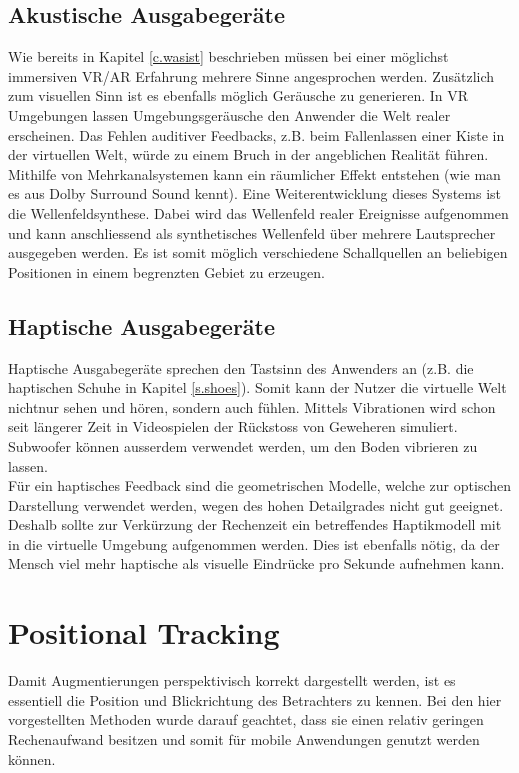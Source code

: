 \subsection*{Akustische Ausgabegeräte}
Wie bereits in Kapitel \ref{c.wasist} beschrieben müssen bei einer möglichst immersiven VR/AR Erfahrung mehrere Sinne angesprochen werden. Zusätzlich zum visuellen Sinn ist es ebenfalls möglich Geräusche zu generieren. In VR Umgebungen lassen Umgebungsgeräusche den Anwender die Welt realer erscheinen. Das Fehlen auditiver Feedbacks, z.B. beim Fallenlassen einer Kiste in der virtuellen Welt, würde zu einem Bruch in der angeblichen Realität führen.\\[6pt]
Mithilfe von Mehrkanalsystemen kann ein räumlicher Effekt entstehen (wie man es aus Dolby Surround Sound kennt). Eine Weiterentwicklung dieses Systems ist die Wellenfeldsynthese. Dabei wird das Wellenfeld realer Ereignisse aufgenommen und kann anschliessend als synthetisches Wellenfeld über mehrere Lautsprecher ausgegeben werden. Es ist somit möglich verschiedene Schallquellen an beliebigen Positionen in einem begrenzten Gebiet zu erzeugen.\cite[S.~154]{doerner13}
\vspace{-10pt}
\subsection*{Haptische Ausgabegeräte}
Haptische Ausgabegeräte sprechen den Tastsinn des Anwenders an (z.B. die haptischen Schuhe in Kapitel \ref{s.shoes}). Somit kann der Nutzer die virtuelle Welt nichtnur sehen und hören, sondern auch fühlen. Mittels Vibrationen wird schon seit längerer Zeit in Videospielen der Rückstoss von Geweheren simuliert. Subwoofer können ausserdem verwendet werden, um den Boden vibrieren zu lassen.\\[6pt]
Für ein haptisches Feedback sind die geometrischen Modelle, welche zur optischen Darstellung verwendet werden, wegen des hohen Detailgrades nicht gut geeignet. Deshalb sollte zur Verkürzung der Rechenzeit ein betreffendes Haptikmodell mit in die virtuelle Umgebung aufgenommen werden. Dies ist ebenfalls nötig, da der Mensch viel mehr haptische als visuelle Eindrücke pro Sekunde aufnehmen kann.\cite[S.~154~f.]{doerner13}
\newpage
\section{Positional Tracking}\label{s.positional}
Damit Augmentierungen perspektivisch korrekt dargestellt werden, ist es essentiell die Position und Blickrichtung des Betrachters zu kennen. Bei den hier vorgestellten Methoden wurde darauf geachtet, dass sie einen relativ geringen Rechenaufwand besitzen und somit für mobile Anwendungen genutzt werden können.
\vspace{-10pt}
